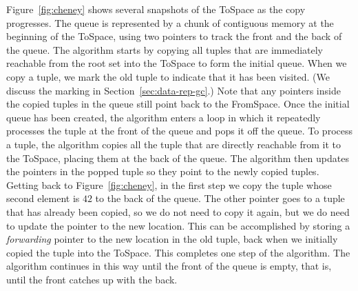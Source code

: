 \documentclass[11pt]{book}
\begin{document}
Figure~\ref{fig:cheney} shows several snapshots of the ToSpace as the
copy progresses. The queue is represented by a chunk of contiguous
memory at the beginning of the ToSpace, using two pointers to track
the front and the back of the queue. The algorithm starts by copying
all tuples that are immediately reachable from the root set into the
ToSpace to form the initial queue.  When we copy a tuple, we mark the
old tuple to indicate that it has been visited. (We discuss the
marking in Section~\ref{sec:data-rep-gc}.) Note that any pointers
inside the copied tuples in the queue still point back to the
FromSpace. Once the initial queue has been created, the algorithm
enters a loop in which it repeatedly processes the tuple at the front
of the queue and pops it off the queue.  To process a tuple, the
algorithm copies all the tuple that are directly reachable from it to
the ToSpace, placing them at the back of the queue. The algorithm then
updates the pointers in the popped tuple so they point to the newly
copied tuples. Getting back to Figure~\ref{fig:cheney}, in the first
step we copy the tuple whose second element is $42$ to the back of the
queue. The other pointer goes to a tuple that has already been copied,
so we do not need to copy it again, but we do need to update the
pointer to the new location. This can be accomplished by storing a
\emph{forwarding} pointer to the new location in the old tuple, back
when we initially copied the tuple into the ToSpace. This completes
one step of the algorithm. The algorithm continues in this way until
the front of the queue is empty, that is, until the front catches up
with the back.
\end{document}
